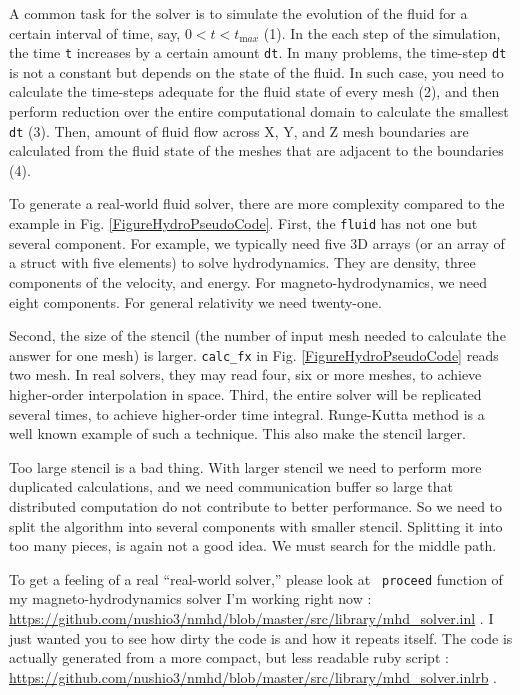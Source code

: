 \documentclass[twocolumn]{article}
\begin{document}
A common task for the solver is to simulate the evolution of the fluid for a
certain interval of time, say, $0 < t < t_{\mathrm max}$ (1). In the each step
of the simulation, the time {\tt t} increases by a certain amount {\tt dt}.
In many problems, the time-step {\tt dt} is not a constant but depends on the
state of the fluid. In such case, you need to calculate the time-steps adequate
for the fluid state of every mesh (2), and then perform reduction over the
entire computational domain to calculate the smallest {\tt dt} (3). Then,
amount of fluid flow across X, Y, and Z mesh boundaries are calculated from
the fluid state of the meshes that are adjacent to the boundaries (4). 

To generate a real-world fluid solver, there are more complexity compared to
the example in Fig. \ref{FigureHydroPseudoCode}. First, the {\tt fluid} has
not one but several component. For example, we typically need five 3D arrays
(or an array of a struct with five elements) to solve hydrodynamics. They are
density, three components of the velocity, and energy. For
magneto-hydrodynamics, we need eight components. For general relativity we
need twenty-one.

Second, the size of the stencil (the number of input mesh needed to calculate
the answer for one mesh) is larger. {\tt calc\_fx} in
Fig. \ref{FigureHydroPseudoCode} reads two mesh. In real solvers, they may
read four, six or more meshes, to achieve higher-order interpolation in space.
Third, the entire solver will be replicated several times, to achieve
higher-order time integral. Runge-Kutta method is a well known example of such
a technique. This also make the stencil larger.

Too large stencil is a bad thing. With larger stencil we need to perform more
duplicated calculations, and we need communication buffer so large that
distributed computation do not contribute to better performance. So we need to
split the algorithm into several components with smaller stencil. Splitting it
into too many pieces, is again not a good idea. We must search for the middle
path.

To get a feeling of a real ``real-world solver,'' please look at {\tt
  proceed} function of my magneto-hydrodynamics solver I'm working
right now :
\url{https://github.com/nushio3/nmhd/blob/master/src/library/mhd_solver.inl}
. I just wanted you to see how dirty the code is and how it repeats
itself. The code is actually generated from a more compact, but less
readable ruby script :
\url{https://github.com/nushio3/nmhd/blob/master/src/library/mhd_solver.inlrb}
.
\end{document}

